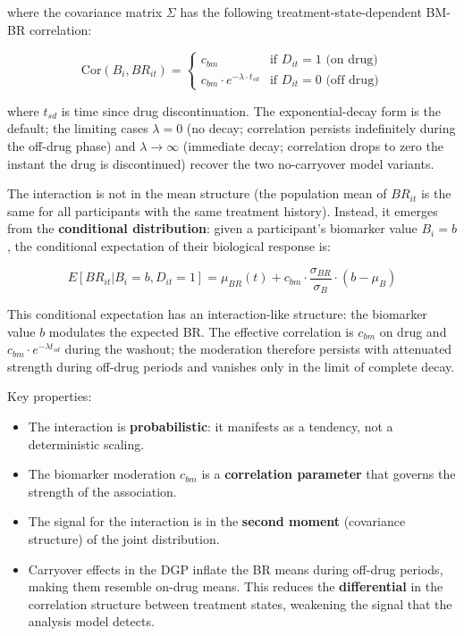\documentclass[11pt]{article}
\begin{document}
where the covariance matrix $\Sigma$ has the following
treatment-state-dependent BM-BR correlation:

\[\text{Cor}(B_i, BR_{it}) = \begin{cases}
c_{bm} & \text{if } D_{it} = 1 \text{ (on drug)} \\
c_{bm} \cdot e^{-\lambda \cdot t_{sd}} &
\text{if } D_{it} = 0 \text{ (off drug)}
\end{cases}\]

where $t_{sd}$ is time since drug discontinuation. The
exponential-decay form is the default; the limiting cases
$\lambda = 0$ (no decay; correlation persists indefinitely
during the off-drug phase) and $\lambda \to \infty$ (immediate
decay; correlation drops to zero the instant the drug is
discontinued) recover the two no-carryover model variants.

The interaction is not in the mean structure (the population mean
of $BR_{it}$ is the same for all participants with the same
treatment history). Instead, it emerges from the \textbf{conditional
distribution}: given a participant's biomarker value $B_i = b$,
the conditional expectation of their biological response is:

\[E[BR_{it} | B_i = b, D_{it} = 1] = \mu_{BR}(t) + c_{bm}
\cdot \frac{\sigma_{BR}}{\sigma_B} \cdot (b - \mu_B)\]

This conditional expectation has an interaction-like structure:
the biomarker value $b$ modulates the expected BR. The effective
correlation is $c_{bm}$ on drug and $c_{bm} \cdot
e^{-\lambda t_{sd}}$ during the washout; the moderation therefore
persists with attenuated strength during off-drug periods and
vanishes only in the limit of complete decay.

Key properties:

\begin{itemize}
\item The interaction is \textbf{probabilistic}: it manifests as a
  tendency, not a deterministic scaling.
\item The biomarker moderation $c_{bm}$ is a \textbf{correlation
  parameter} that governs the strength of the association.
\item The signal for the interaction is in the \textbf{second moment}
  (covariance structure) of the joint distribution.
\item Carryover effects in the DGP inflate the BR means during
  off-drug periods, making them resemble on-drug means. This
  reduces the \textbf{differential} in the correlation structure
  between treatment states, weakening the signal that the
  analysis model detects.
\end{itemize}
\end{document}
